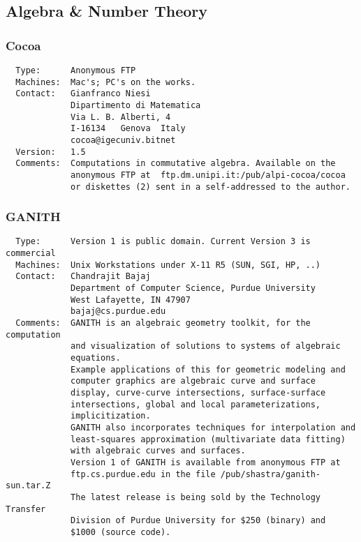 \subsection{Algebra \& Number Theory}

\subsubsection{Cocoa}
\begin{verbatim}
  Type:      Anonymous FTP
  Machines:  Mac's; PC's on the works.
  Contact:   Gianfranco Niesi
             Dipartimento di Matematica
             Via L. B. Alberti, 4
             I-16134   Genova  Italy
             cocoa@igecuniv.bitnet
  Version:   1.5
  Comments:  Computations in commutative algebra. Available on the
             anonymous FTP at  ftp.dm.unipi.it:/pub/alpi-cocoa/cocoa
             or diskettes (2) sent in a self-addressed to the author.
\end{verbatim}

\subsubsection{GANITH}
\begin{verbatim}
  Type:      Version 1 is public domain. Current Version 3 is commercial
  Machines:  Unix Workstations under X-11 R5 (SUN, SGI, HP, ..)
  Contact:   Chandrajit Bajaj
             Department of Computer Science, Purdue University
             West Lafayette, IN 47907
             bajaj@cs.purdue.edu
  Comments:  GANITH is an algebraic geometry toolkit, for the computation
             and visualization of solutions to systems of algebraic
             equations.
             Example applications of this for geometric modeling and
             computer graphics are algebraic curve and surface
             display, curve-curve intersections, surface-surface
             intersections, global and local parameterizations,
             implicitization.
             GANITH also incorporates techniques for interpolation and
             least-squares approximation (multivariate data fitting)
             with algebraic curves and surfaces.
             Version 1 of GANITH is available from anonymous FTP at
             ftp.cs.purdue.edu in the file /pub/shastra/ganith-sun.tar.Z
             The latest release is being sold by the Technology Transfer
             Division of Purdue University for $250 (binary) and
             $1000 (source code).
\end{verbatim}

